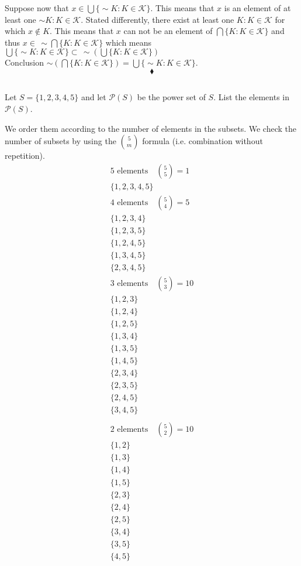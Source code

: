 Suppose now that $x\in \bigcup\{\sim K:K\in \mathscr{K}\}$. This means that $x$ is an element of  at least one $\sim K: K\in   \mathscr{K}$. Stated differently, there exist at least one $ K: K\in   \mathscr{K}$ for which $x\not \in K$. This means that $x$ can not be an element of $\bigcap \{K:K\in \mathscr{K}\}$ and thus $x\in \, \sim \bigcap \{K:K\in \mathscr{K}\}$ which means $\bigcup\{\sim K:K\in \mathscr{K}\}\subset \, \sim(\bigcup \{K:K\in \mathscr{K}\})$\\
Conclusion $\sim(\bigcap \{K:K\in \mathscr{K}\}) = \bigcup\{\sim K:K\in \mathscr{K}\}$.
$$\blacklozenge$$
\newpage
\subsection{}
\begin{tcolorbox}
Let $S=\{1,2,3,4,5\}$ and let $\mathscr{P}(S)$ be the power set of $S$. List the elements in $\mathscr{P}(S)$.
\end{tcolorbox}
We order them according to the number of elements in the subsets. We check the number of subsets by using the $\binom{5}{m}$ formula (i.e. combination without repetition). 
\begin{align*}
5 \text{ elements}\quad \binom{5}{5}= 1\\
\{1,2,3,4,5\}\\
4 \text{ elements}\quad \binom{5}{4}= 5\\
\{1,2,3,4\}\\
\{1,2,3,5\}\\
\{1,2,4,5\}\\
\{1,3,4,5\}\\
\{2,3,4,5\}\\
3 \text{ elements}\quad \binom{5}{3}= 10\\
\{1,2,3\}\\
\{1,2,4\}\\
\{1,2,5\}\\
\{1,3,4\}\\
\{1,3,5\}\\
\{1,4,5\}\\
\{2,3,4\}\\
\{2,3,5\}\\
\{2,4,5\}\\
\{3,4,5\}\\
\end{align*}
\begin{align*}
2 \text{ elements}\quad \binom{5}{2}= 10\\
\{1,2\}\\
\{1,3\}\\
\{1,4\}\\
\{1,5\}\\
\{2,3\}\\
\{2,4\}\\
\{2,5\}\\
\{3,4\}\\
\{3,5\}\\
\{4,5\}\\
\end{align*}
